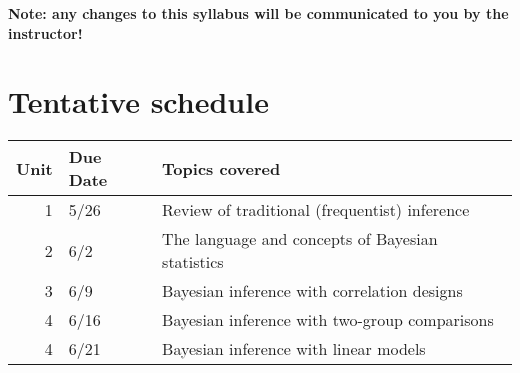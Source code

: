 \documentclass[10pt]{article}
\begin{document}
\textbf{Note:  any changes to this syllabus will be communicated to you by the instructor!}

\section*{Tentative schedule}
\label{sec:org457af17}

\begin{center}
\begin{tabular}{rll}
Unit & Due Date & Topics covered\\[0pt]
\hline
1 & 5/26 & Review of traditional (frequentist) inference\\[0pt]
2 & 6/2 & The language and concepts of Bayesian statistics\\[0pt]
3 & 6/9 & Bayesian inference with correlation designs\\[0pt]
4 & 6/16 & Bayesian inference with two-group comparisons\\[0pt]
4 & 6/21 & Bayesian inference with linear models\\[0pt]
\end{tabular}
\end{center}
\end{document}

